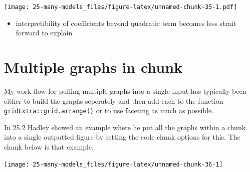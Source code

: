 \documentclass[]{book}
\newenvironment{Shaded}{\begin{snugshade}}{\end{snugshade}}
\newcommand{\DataTypeTok}[1]{\textcolor[rgb]{0.13,0.29,0.53}{#1}}
\newcommand{\KeywordTok}[1]{\textcolor[rgb]{0.13,0.29,0.53}{\textbf{#1}}}
\newcommand{\NormalTok}[1]{#1}
\newcommand{\OperatorTok}[1]{\textcolor[rgb]{0.81,0.36,0.00}{\textbf{#1}}}
\newcommand{\StringTok}[1]{\textcolor[rgb]{0.31,0.60,0.02}{#1}}
\providecommand{\tightlist}{%
  \setlength{\itemsep}{0pt}\setlength{\parskip}{0pt}}
\theoremstyle{definition}
\theoremstyle{definition}
\theoremstyle{definition}
\theoremstyle{remark}
\begin{document}
\texttt{[image: 25-many-models\_files/figure-latex/unnamed-chunk-35-1.pdf]}

\begin{itemize}
\tightlist
\item
  interpretibility of coefficients beyond quadratic term becomes less
  strait forward to explain
\end{itemize}

\hypertarget{multiple-graphs-in-chunk}{%
\section{Multiple graphs in chunk}\label{multiple-graphs-in-chunk}}

My work flow for pulling multiple graphs into a single input has
typically been either to build the graphs seperately and then add each
to the function \texttt{gridExtra::grid.arrange()} or to use faceting as
much as possible.

In 25.2 Hadley showed an example where he put all the graphs within a
chunk into a single outputted figure by setting the code chunk options
for this. The chunk below is that example.

\begin{Shaded}
\end{Shaded}

\texttt{[image: 25-many-models\_files/figure-latex/unnamed-chunk-36-1]}

\begin{Shaded}
\end{Shaded}
\end{document}
